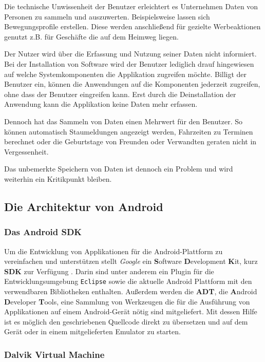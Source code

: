 Die technische Unwissenheit der Benutzer erleichtert es Unternehmen Daten von Personen zu sammeln und auszuwerten. Beispielsweise lassen sich Bewegungsprofile erstellen. Diese werden anschließend für gezielte Werbeaktionen genutzt z.B. für Geschäfte die auf dem Heimweg liegen.

Der Nutzer wird über die Erfassung und Nutzung seiner Daten nicht informiert. Bei der Installation von Software wird der Benutzer lediglich drauf hingewiesen auf welche Systemkomponenten die Applikation zugreifen möchte. Billigt der Benutzer ein, können die Anwendungen auf die Komponenten jederzeit zugreifen, ohne dass der Benutzer eingreifen kann. Erst durch die Deinstallation der Anwendung kann die Applikation keine Daten mehr erfassen.

Dennoch hat das Sammeln von Daten einen Mehrwert für den Benutzer. So können automatisch Staumeldungen angezeigt werden, Fahrzeiten zu Terminen berechnet oder die Geburtstage von Freunden oder Verwandten geraten nicht in Vergessenheit.

Das unbemerkte Speichern von Daten ist dennoch ein Problem und wird weiterhin ein Kritikpunkt bleiben.

\subsection{Die Architektur von Android}

\subsubsection{Das Android SDK}

Um die Entwicklung von Applikationen für die Android-Plattform zu vereinfachen und unterstützen stellt \emph{Google} ein \textbf{S}oftware \textbf{D}evelopment \textbf{K}it, kurz \textbf{SDK} zur Verfügung \cite{android_sdk}. Darin sind unter anderem ein Plugin für die Entwicklungsumgebung \verb+Eclipse+ sowie die aktuelle Android Plattform mit den verwendbaren Bibliotheken enthalten. Außerdem werden die \textbf{ADT}, die \textbf{A}ndroid \textbf{D}eveloper \textbf{T}ools, eine Sammlung von Werkzeugen die für die Ausführung von Applikationen auf einem Android-Gerät nötig sind mitgeliefert. Mit dessen Hilfe ist es möglich den geschriebenen Quellcode direkt zu übersetzen und auf dem Gerät oder in einem mitgelieferten Emulator zu starten.

\subsubsection{Dalvik Virtual Machine}

